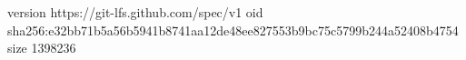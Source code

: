 version https://git-lfs.github.com/spec/v1
oid sha256:e32bb71b5a56b5941b8741aa12de48ee827553b9bc75c5799b244a52408b4754
size 1398236
